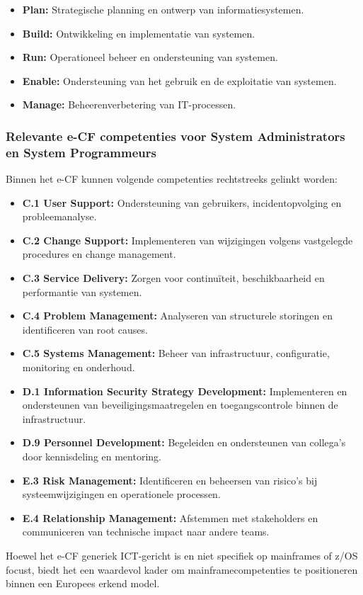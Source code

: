 \begin{itemize}
	\item \textbf{Plan:} Strategische planning en ontwerp van informatiesystemen.
	\item \textbf{Build:} Ontwikkeling en implementatie van systemen.
	\item \textbf{Run:} Operationeel beheer en ondersteuning van systemen.
	\item \textbf{Enable:} Ondersteuning van het gebruik en de exploitatie van systemen.
	\item \textbf{Manage:} Beheerenverbetering van IT-processen.
\end{itemize}

\subsubsection{Relevante e-CF competenties voor System Administrators en System Programmeurs}
Binnen het e-CF kunnen volgende competenties rechtstreeks gelinkt worden:
\begin{itemize}
	\item \textbf{C.1 User Support:} Ondersteuning van gebruikers, incidentopvolging en probleemanalyse.
	\item \textbf{C.2 Change Support:} Implementeren van wijzigingen volgens vastgelegde procedures en change management.
	\item \textbf{C.3 Service Delivery:} Zorgen voor continuïteit, beschikbaarheid en performantie van systemen.
	\item \textbf{C.4 Problem Management:} Analyseren van structurele storingen en identificeren van root causes.
	\item \textbf{C.5 Systems Management:} Beheer van infrastructuur, configuratie, monitoring en onderhoud. 
	\item \textbf{D.1 Information Security Strategy Development:} Implementeren en ondersteunen van beveiligingsmaatregelen en toegangscontrole binnen de infrastructuur.
	\item \textbf{D.9 Personnel Development:} Begeleiden en ondersteunen van collega’s door kennisdeling en mentoring.
	\item \textbf{E.3 Risk Management:} Identificeren en beheersen van risico’s bij systeemwijzigingen en operationele processen.
	\item \textbf{E.4 Relationship Management:} Afstemmen met stakeholders en communiceren van technische impact naar andere teams.
\end{itemize}
Hoewel het e-CF generiek ICT-gericht is en niet specifiek op mainframes of z/OS focust, biedt het een waardevol kader om mainframecompetenties te positioneren binnen een Europees erkend model.


